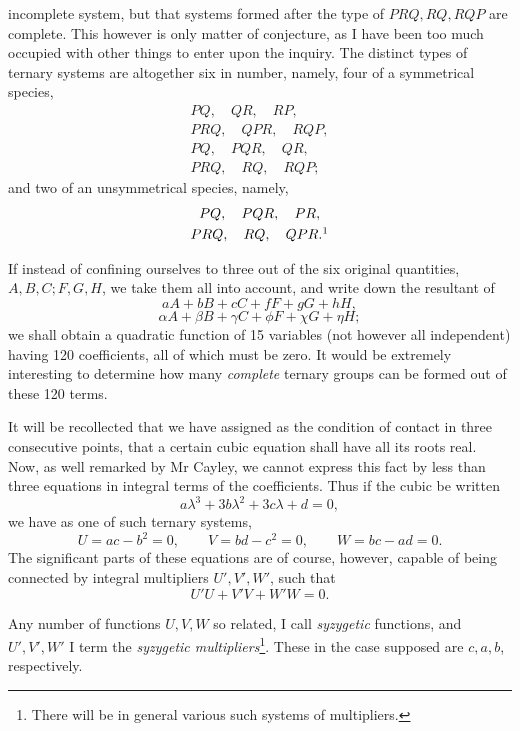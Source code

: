 \documentclass[11pt]{article}
\newcommand{\sourcepage}[1]{\marginpar{\scriptsize p.~#1}}
\begin{document}
\sourcepage{131}
incomplete system, but that systems formed after the type of $PRQ,RQ,RQP$ are complete. This however is only matter of conjecture, as I have been too much occupied with other things to enter upon the inquiry. The distinct types of ternary systems are altogether six in number, namely, four of a symmetrical species,
\[
\begin{gathered}
PQ,\quad QR,\quad RP,\\
PRQ,\quad QPR,\quad RQP,\\
PQ,\quad PQR,\quad QR,\\
PRQ,\quad RQ,\quad RQP;
\end{gathered}
\]
and two of an unsymmetrical species, namely,
\[
\begin{gathered}
PQ,\quad PQR,\quad PR,\\
PRQ,\quad RQ,\quad QPR.\footnotemark
\end{gathered}
\]

If instead of confining ourselves to three out of the six original quantities, $A,B,C;F,G,H$, we take them all into account, and write down the resultant of
\[
aA+bB+cC+fF+gG+hH,
\]
\[
\alpha A+\beta B+\gamma C+\phi F+\chi G+\eta H;
\]
we shall obtain a quadratic function of 15 variables (not however all independent) having 120 coefficients, all of which must be zero. It would be extremely interesting to determine how many \emph{complete} ternary groups can be formed out of these 120 terms.

It will be recollected that we have assigned as the condition of contact in three consecutive points, that a certain cubic equation shall have all its roots real. Now, as well remarked by Mr Cayley, we cannot express this fact by less than three equations in integral terms of the coefficients. Thus if the cubic be written
\[
a\lambda^3+3b\lambda^2+3c\lambda+d=0,
\]
we have as one of such ternary systems,
\[
U=ac-b^2=0,\qquad V=bd-c^2=0,\qquad W=bc-ad=0.
\]
The significant parts of these equations are of course, however, capable of being connected by integral multipliers $U',V',W'$, such that
\[
U'U+V'V+W'W=0.
\]

\sourcepage{132}
Any number of functions $U,V,W$ so related, I call \emph{syzygetic} functions, and $U',V',W'$ I term the \emph{syzygetic multipliers}\footnote{There will be in general various such systems of multipliers.}. These in the case supposed are $c,a,b$, respectively.
\end{document}
